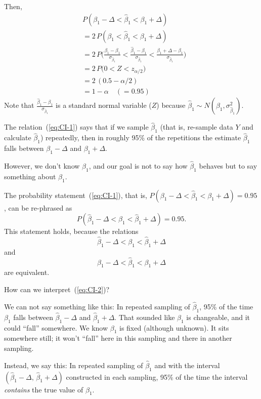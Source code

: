 \documentclass[12pt]{article}
\begin{document}
Then,
\begin{equation}\label{eq:CI-1}
\begin{split}
&P(\beta_1 - \Delta < \hat\beta_1 < \beta_1 + \Delta)
\\
&= 2\, P(\beta_1 < \hat\beta_1 < \beta_1 + \Delta)
\\
&= 2\, P\biggl(\frac{\beta_1 - \beta_1}{\sigma_{\hat\beta_1}}
    < \frac{\hat\beta_1 - \beta_1}{\sigma_{\hat\beta_1}}
    < \frac{\beta_1 + \Delta - \beta_1}{\sigma_{\hat\beta_1}}
    \biggr)
\\
&= 2\, P\bigl(0 < Z < z_{\alpha/2}\bigr)
\\
&= 2\, (0.5 - \alpha/2)
\\
&= 1 - \alpha\quad (=0.95)
\end{split}
\end{equation}
Note that
$\frac{\hat\beta_1 - \beta_1}{\sigma_{\hat\beta_1}}$
is a standard normal variable ($Z$)
because
$\hat\beta_1 \sim N(\beta_1, \sigma^2_{\hat\beta_1})$.

The relation~(\ref{eq:CI-1}) says that
if we sample $\hat\beta_1$
(that is, re-sample data $Y$ and calculate $\hat\beta_1$)
repeatedly, then in roughly 95\% of the repetitions
the estimate $\hat\beta_1$ falls between
$\beta_1 - \Delta$ and $\beta_1 + \Delta$.

However, we don't know $\beta_1$,
and our goal is not to say how $\hat\beta_1$ behaves but to
say something about $\beta_1$.

The probability statement~(\ref{eq:CI-1}), that is,
$P(\beta_1 - \Delta < \hat\beta_1 < \beta_1 + \Delta)
= 0.95$,
can be re-phrased as
\begin{equation}\label{eq:CI-2}
P(\hat\beta_1 - \Delta < \beta_1 < \hat\beta_1 + \Delta)
= 0.95.
\end{equation}
This statement holds, because
the relations
\[
\hat\beta_1 - \Delta < \beta_1 < \hat\beta_1 + \Delta
\]
and
\[
\beta_1 - \Delta < \hat\beta_1 < \beta_1 + \Delta
\]
are equivalent.

How can we interpret~(\ref{eq:CI-2})?

We can not say something like this:
In repeated sampling of $\hat\beta_1$,
95\% of the time $\beta_1$ falls between
$\hat\beta_1 - \Delta$ and $\hat\beta_1 + \Delta$.
That sounded like $\beta_1$ is changeable,
and it could ``fall'' somewhere.
We know $\beta_1$ is fixed (although unknown).
It sits somewhere still;
it won't ``fall'' here in this sampling and there in another sampling.

Instead, we say this:
In repeated sampling of $\hat\beta_1$
and with the interval
$(\hat\beta_1 - \Delta,\, \hat\beta_1 + \Delta)$
constructed in each sampling,
95\% of the time the interval \emph{contains} the true value of
$\beta_1$.
\end{document}
